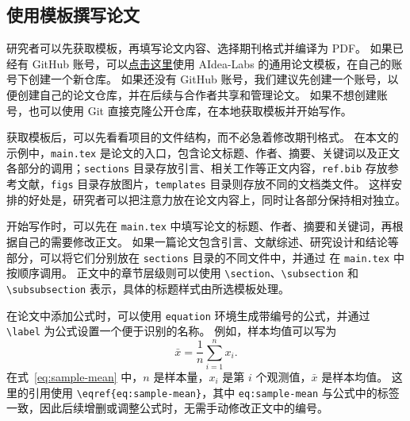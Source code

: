 \subsection{使用模板撰写论文}
\label{sec:how}

研究者可以先获取模板，再填写论文内容、选择期刊格式并编译为 PDF。
如果已经有 GitHub 账号，可以\href{https://github.com/new?template_name=paper-template&template_owner=aidea-labs}{\underline{点击这里}}使用 AIdea-Labs 的通用论文模板，在自己的账号下创建一个新仓库。
如果还没有 GitHub 账号，我们建议先创建一个账号，以便创建自己的论文仓库，并在后续与合作者共享和管理论文。
如果不想创建账号，也可以使用 Git 直接克隆公开仓库，在本地获取模板并开始写作。

获取模板后，可以先看看项目的文件结构，而不必急着修改期刊格式。
在本文的示例中，\texttt{main.tex} 是论文的入口，包含论文标题、作者、摘要、关键词以及正文各部分的调用；\texttt{sections} 目录存放引言、相关工作等正文内容，\texttt{ref.bib} 存放参考文献，\texttt{figs} 目录存放图片，\texttt{templates} 目录则存放不同的文档类文件。
这样安排的好处是，研究者可以把注意力放在论文内容上，同时让各部分保持相对独立。

开始写作时，可以先在 \texttt{main.tex} 中填写论文的标题、作者、摘要和关键词，再根据自己的需要修改正文。
如果一篇论文包含引言、文献综述、研究设计和结论等部分，可以将它们分别放在 \texttt{sections} 目录的不同文件中，并通过 \verb|| 在 \texttt{main.tex} 中按顺序调用。
正文中的章节层级则可以使用 \verb|\section|、\verb|\subsection| 和 \verb|\subsubsection| 表示，具体的标题样式由所选模板处理。

在论文中添加公式时，可以使用 \texttt{equation} 环境生成带编号的公式，并通过 \verb|\label| 为公式设置一个便于识别的名称。
例如，样本均值可以写为
\begin{equation}
    \bar{x}=\frac{1}{n}\sum_{i=1}^{n}x_i.
    \label{eq:sample-mean}
\end{equation}
在式~\eqref{eq:sample-mean} 中，$n$ 是样本量，$x_i$ 是第 $i$ 个观测值，$\bar{x}$ 是样本均值。
这里的引用使用 \verb|\eqref{eq:sample-mean}|，其中 \texttt{eq:sample-mean} 与公式中的标签一致，因此后续增删或调整公式时，无需手动修改正文中的编号。

